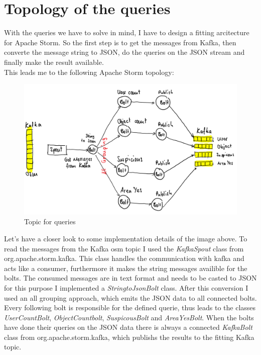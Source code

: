\newpage
\section{Topology of the queries}
With the queries we have to solve in mind, I have to design a fitting arcitecture for Apache Storm.
So the first step is to get the messages from Kafka, then converte the message string to JSON,
do the queries on the JSON stream and finally make the result available.\\
\medskip
This leads me to the following Apache Storm topology:
\begin{figure}[H]
\centering
\captionsetup{justification=centering}
\includegraphics[width=1.0\textwidth]{images/impl_topic.png}
\caption[Topic for queries]{Topic for queries}
\end{figure}
Let's have a closer look to some implementation details of the image above.
To read the messages from the Kafka osm topic I used the \textit{KafkaSpout} class from org.apache.storm.kafka.
This class handles the communication with kafka and acts like a consumer, furthermore it makes the string messages availible for the bolts.
The consumed messages are in text format and needs to be casted to JSON for this purpose I implemented a \textit{StringtoJsonBolt} class.
After this conversion I used an all grouping approach, which emits the JSON data to all connected bolts.
Every following bolt is responsible for the defined querie, thus leads to the classes \textit{UserCountBolt}, \textit{ObjectCountbolt}, \textit{SuspicousBolt} and \textit{AreaYesBolt}.
When the bolts have done their queries on the JSON data there is always a connected \textit{KafkaBolt} class from org.apache.storm.kafka,
which publishs the results to the fitting Kafka topic.

